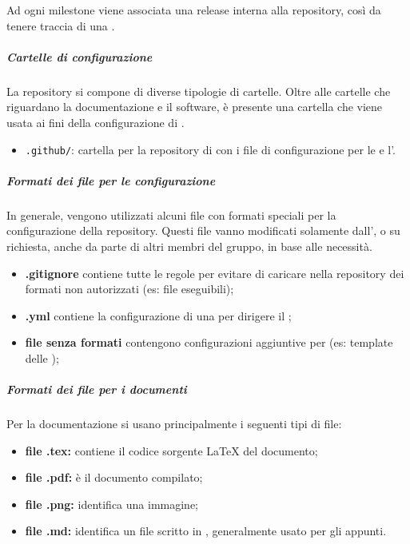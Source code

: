 		Ad ogni milestone viene associata una release interna alla repository, così da tenere traccia di una .

		\subparagraph{Cartelle di configurazione}

		La repository si compone di diverse tipologie di cartelle. Oltre alle cartelle che riguardano la documentazione e il software, è presente una cartella che viene usata ai fini della configurazione di .
		\begin{itemize}
			\item \verb!.github/!: cartella per la repository di  con i file di configurazione per le  e l'.
		\end{itemize}

		\subparagraph{Formati dei file per le configurazione}

		In generale, vengono utilizzati alcuni file con formati speciali per la configurazione della repository. Questi file vanno modificati solamente dall', o su richiesta, anche da parte di altri membri del gruppo, in base alle necessità.
		\begin{itemize}
			\item \textbf{.gitignore} contiene tutte le regole per evitare di caricare nella repository dei formati non autorizzati (es: file eseguibili);
			\item \textbf{.yml} contiene la configurazione di una  per dirigere il ;
			\item \textbf{file senza formati} contengono configurazioni aggiuntive per  (es: template delle );
		\end{itemize}

		\subparagraph{Formati dei file per i documenti}

		Per la documentazione si usano principalmente i seguenti tipi di file:
		\begin{itemize}
			\item \textbf{file .tex:} contiene il codice sorgente \LaTeX{} del documento;
			\item \textbf{file .pdf:} è il documento compilato;
			\item \textbf{file .png:} identifica una immagine;
			\item \textbf{file .md:} identifica un file scritto in , generalmente usato per gli appunti.
		\end{itemize}


